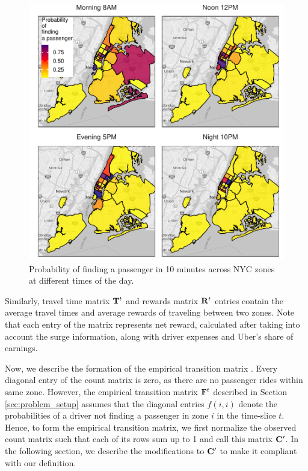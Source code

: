 \begin{figure}
	\centering
	\includegraphics{figures/successful_heatmap.pdf}
	\caption{Probability of finding a passenger in 10 minutes across NYC zones at different times of the day.}
	\label{fig:successful_heatmap}
\end{figure}


Similarly, travel time matrix ${\mathbf{T}}^t$ and rewards matrix ${\mathbf{R}}^t$ entries contain the average travel times and average rewards of traveling between two zones. Note that each entry of the {\rewardsmatrix} matrix represents net reward, calculated after taking into account the surge information, along with driver expenses and Uber's share of earnings.

Now, we describe the formation of the empirical transition matrix {\empiricaltransitionmatrix}. Every diagonal entry of the count matrix {\countmatrix} is zero, as there are no passenger rides within same zone. However, the empirical transition matrix {${\mathbf{F}}^t$} described in Section \ref{sec:problem_setup} assumes that the diagonal entries $f(i,i)$ denote the probabilities of a driver not finding a passenger in zone $i$ in the time-slice $t$. Hence, to form the empirical transition matrix, we first normalize the observed count matrix such that each of its rows sum up to 1 and call this matrix ${\mathbf{C}}^\prime$. In the following section, we describe the modifications to ${\mathbf{C}}^\prime$ to make it compliant with our definition.

